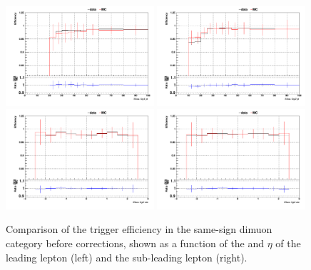 \begin{figure}[htp]
\centering
\includegraphics[width=0.49\textwidth]{ch6_figs/1D_eff_lep1_pt_uu_ARCv2_change_3l_pt_ranges.pdf}
\includegraphics[width=0.49\textwidth]{ch6_figs/1D_eff_lep2_pt_uu_ARCv2_change_3l_pt_ranges.pdf} \\
\includegraphics[width=0.49\textwidth]{ch6_figs/1D_eff_lep1_eta_uu_ARCv2_change_3l_pt_ranges.pdf}
\includegraphics[width=0.49\textwidth]{ch6_figs/1D_eff_lep2_eta_uu_ARCv2_change_3l_pt_ranges.pdf}
\caption[Trigger efficiency in the 2lss $\mu\mu$ category]{Comparison of the trigger efficiency in the same-sign dimuon category before 
corrections, shown as a function of the \pt and $\eta$ of the leading lepton (left) 
and the sub-leading lepton (right).}
\label{fig:trigeffsmumu}
\end{figure}

